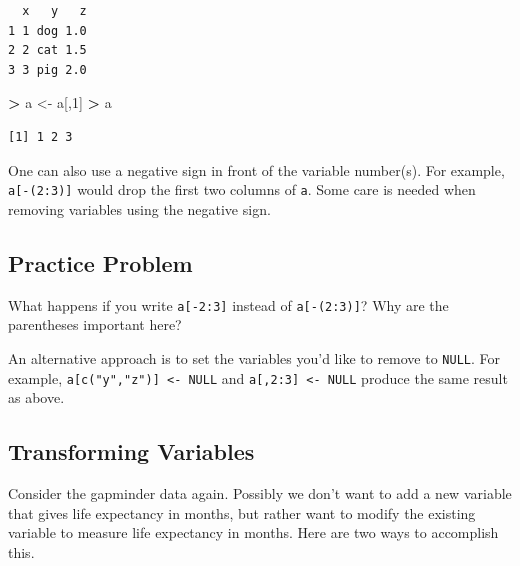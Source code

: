 \documentclass[]{krantz}
\makeatletter
\newenvironment{Shaded}{\begin{snugshade}}{\end{snugshade}}
\newcommand{\KeywordTok}[1]{\textcolor[rgb]{0.27,0.27,0.27}{\textbf{#1}}}
\newcommand{\DecValTok}[1]{\textcolor[rgb]{0.06,0.06,0.06}{#1}}
\newcommand{\StringTok}[1]{\textcolor[rgb]{0.5,0.5,0.5}{#1}}
\newcommand{\OperatorTok}[1]{\textcolor[rgb]{0.43,0.43,0.43}{\textbf{#1}}}
\newcommand{\NormalTok}[1]{#1}
\newenvironment{kframe}{%
\medskip{}
\setlength{\fboxsep}{.8em}
 \def\at@end@of@kframe{}%
 \ifinner\ifhmode%
  \def\at@end@of@kframe{\end{minipage}}%
  \begin{minipage}{\columnwidth}%
 \fi\fi%
 \def\FrameCommand##1{\hskip\@totalleftmargin \hskip-\fboxsep
 \colorbox{shadecolor}{##1}\hskip-\fboxsep
     \hskip-\linewidth \hskip-\@totalleftmargin \hskip\columnwidth}%
 \MakeFramed {\advance\hsize-\width
   \@totalleftmargin\z@ \linewidth\hsize
   \@setminipage}}%
 {\par\unskip\endMakeFramed%
 \at@end@of@kframe}
\renewenvironment{Shaded}{\begin{kframe}}{\end{kframe}}
\makeatother
\begin{document}
\begin{verbatim}
  x   y   z
1 1 dog 1.0
2 2 cat 1.5
3 3 pig 2.0
\end{verbatim}

\begin{Shaded}
\begin{Highlighting}[]
\OperatorTok{>}\StringTok{ }\NormalTok{a <-}\StringTok{ }\NormalTok{a[,}\DecValTok{1}\NormalTok{]}
\OperatorTok{>}\StringTok{ }\NormalTok{a}
\end{Highlighting}
\end{Shaded}

\begin{verbatim}
[1] 1 2 3
\end{verbatim}

One can also use a negative sign in front of the variable number(s). For
example, \texttt{a{[}-(2:3){]}} would drop the first two columns of
\texttt{a}. Some care is needed when removing variables using the
negative sign.

\subsection{Practice Problem}\label{practice-problem-6}

What happens if you write \texttt{a{[}-2:3{]}} instead of
\texttt{a{[}-(2:3){]}}? Why are the parentheses important here?

An alternative approach is to set the variables you'd like to remove to
\texttt{NULL}. For example,
\texttt{a{[}c("y","z"){]}\ \textless{}-\ NULL} and
\texttt{a{[},2:3{]}\ \textless{}-\ NULL} produce the same result as
above.

\subsection{Transforming Variables}\label{transforming-variables}

Consider the gapminder data again. Possibly we don't want to add a new
variable that gives life expectancy in months, but rather want to modify
the existing variable to measure life expectancy in months. Here are two
ways to accomplish this.

\begin{Shaded}
\end{Shaded}
\end{document}
